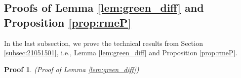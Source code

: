 \documentclass[12pt]{article}
\numberwithin{equation}{section}
\newtheorem{myPro}{Proof}
\theoremstyle{remark}
\newcommand{\1}{{\rm 1}\kern-0.24em{\rm I}}
\begin{document}
\begin{appendices}
 
 
\subsection{Proofs of Lemma  \ref{lem:green_diff} and Proposition \ref{prop:rmeP}}
In the last subsection, we prove the technical results from Section \ref{subsec:21051501}, i.e.,  Lemma  \ref{lem:green_diff} and Proposition \ref{prop:rmeP}.




\begin{myPro}{(Proof of Lemma \ref{lem:green_diff})}


\end{myPro}
\end{appendices}
\end{document}
